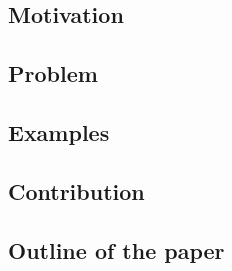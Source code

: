 
\subsection{Motivation}

\subsection{Problem}

\subsection{Examples}

\subsection{Contribution}

\subsection{Outline of the paper}